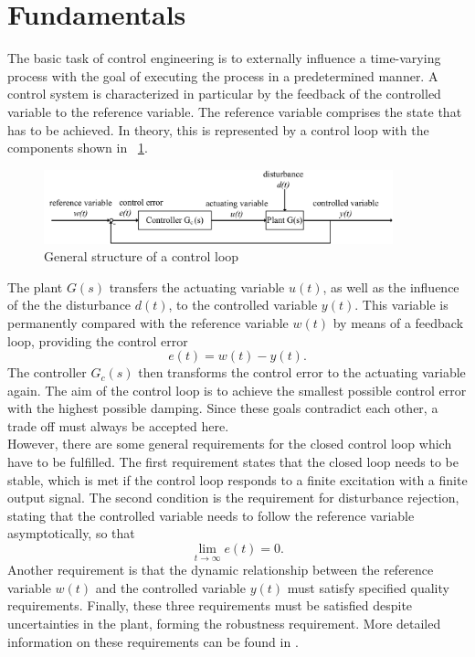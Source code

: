 \section{Fundamentals}
The basic task of control engineering is to externally influence a time-varying process with the goal of executing the process in a predetermined manner. A control system is characterized in particular by the feedback of the controlled variable to the reference variable. The reference variable comprises the state that has to be achieved.
In theory, this is represented by a control loop with the components shown in \figurename~{\ref{fig:control_loop}}.
\begin{figure}
  \centering
  \includegraphics[width=0.9\textwidth]{images/chapt_3/control_loop.pdf}
  \caption[General structure of a control loop]{General structure of a control loop}
  \label{fig:control_loop}
\end{figure}
The plant $G(s)$ transfers the actuating variable $u(t)$, as well as the influence of the the disturbance $d(t)$, to the controlled variable $y(t)$. This variable is permanently compared with the reference variable $w(t)$ by means of a feedback loop, providing the control error
\begin{equation}
  e(t) = w(t) - y(t).
 \label{eq:e_t}
\end{equation}
The controller $G_{c}(s)$ then transforms the control error to the actuating variable again. The aim of the control loop is to achieve the smallest possible control error with the highest possible damping. Since these goals contradict each other, a trade off must always be accepted here. \cite{Reg_17}
\\However, there are some general requirements for the closed control loop which have to be fulfilled. The first requirement states that the closed loop needs to be stable, which is met if the control loop responds to a finite excitation with a finite output signal. The second condition is the requirement for disturbance rejection, stating that the controlled variable needs to follow the reference variable asymptotically, so that
\begin{equation}
    \lim\limits_{t \rightarrow \infty}{e(t)} = 0.
 \label{eq:lim_e}
\end{equation}
Another requirement is that the dynamic relationship between the reference variable $w(t)$ and the controlled variable $y(t)$ must satisfy specified quality requirements.  Finally, these three requirements must be satisfied despite uncertainties in the plant, forming the robustness requirement. More detailed information on these requirements can be found in \cite{Reg_10}.

